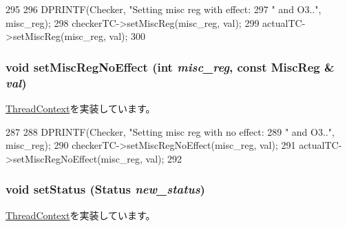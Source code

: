 \begin{DoxyCode}
295     {
296         DPRINTF(Checker, "Setting misc reg with effect: %
297                          " and O3..\n", misc_reg);
298         checkerTC->setMiscReg(misc_reg, val);
299         actualTC->setMiscReg(misc_reg, val);
300     }
\end{DoxyCode}
\hypertarget{classCheckerThreadContext_a763517aaea2f3decbc1ef9d064216b6f}{
\subsubsection[{setMiscRegNoEffect}]{\setlength{\rightskip}{0pt plus 5cm}void setMiscRegNoEffect (int {\em misc\_\-reg}, \/  const {\bf MiscReg} \& {\em val})}}
\label{classCheckerThreadContext_a763517aaea2f3decbc1ef9d064216b6f}


\hyperlink{classThreadContext_a2987c1ff22ebdf6cdf354a31462bdbfb}{ThreadContext}を実装しています。


\begin{DoxyCode}
287     {
288         DPRINTF(Checker, "Setting misc reg with no effect: %
289                          " and O3..\n", misc_reg);
290         checkerTC->setMiscRegNoEffect(misc_reg, val);
291         actualTC->setMiscRegNoEffect(misc_reg, val);
292     }
\end{DoxyCode}
\hypertarget{classCheckerThreadContext_acdf331c877974ed8697216475a21998d}{
\subsubsection[{setStatus}]{\setlength{\rightskip}{0pt plus 5cm}void setStatus ({\bf Status} {\em new\_\-status})}}
\label{classCheckerThreadContext_acdf331c877974ed8697216475a21998d}


\hyperlink{classThreadContext_ab09e388dd57fd5b8e05da30473b0a859}{ThreadContext}を実装しています。


